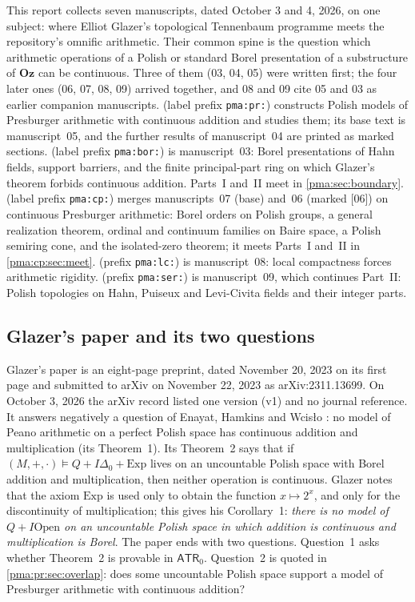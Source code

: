 \documentclass[11pt]{article}
\numberwithin{equation}{section}
\theoremstyle{definition}
\theoremstyle{remark}
\newcommand{\Oz}{\mathbf{Oz}}
\newcommand{\src}[1]{\textup{\textsf{\small[#1]}}}
\begin{document}
This report collects seven manuscripts, dated October 3 and 4, 2026, on one
subject: where Elliot Glazer's topological Tennenbaum programme meets the
repository's omnific arithmetic. Their common spine is the question which
arithmetic operations of a Polish or standard Borel presentation of a
substructure of $\Oz$ can be continuous. Three of them (03, 04, 05) were
written first; the four later ones (06, 07, 08, 09) arrived together, and 08
and 09 cite 05 and 03 as earlier companion manuscripts.
 (label prefix \texttt{pma:pr:}) constructs Polish models of
Presburger arithmetic with continuous addition and studies them; its base
text is manuscript~05, and the further results of manuscript~04 are printed
as marked sections.  (label prefix \texttt{pma:bor:}) is
manuscript~03: Borel presentations of Hahn fields, support barriers, and the
finite principal-part ring on which Glazer's theorem forbids continuous
addition. Parts~I and~II meet in \cref{pma:sec:boundary}.
 (label prefix \texttt{pma:cp:}) merges manuscripts~07 (base)
and~06 (marked \src{06}) on continuous Presburger arithmetic: Borel orders on
Polish groups, a general realization theorem, ordinal and continuum families
on Baire space, a Polish semiring cone, and the isolated-zero theorem; it
meets Parts~I and~II in \cref{pma:cp:sec:meet}.  (prefix
\texttt{pma:lc:}) is manuscript~08: local compactness forces arithmetic
rigidity.  (prefix \texttt{pma:ser:}) is manuscript~09,
which continues Part~II: Polish topologies on Hahn, Puiseux and Levi-Civita
fields and their integer parts.

\subsection{Glazer's paper and its two questions}\label{pma:sec:glazer}

Glazer's paper \cite{Glazer} is an eight-page preprint, dated November 20,
2023 on its first page and submitted to arXiv on November 22, 2023 as
arXiv:2311.13699. On October 3, 2026 the arXiv record listed one version (v1)
and no journal reference. It answers negatively a question of Enayat, Hamkins
and Wcis\l o \cite{EHW}: no model of Peano arithmetic on a perfect Polish
space has continuous addition and multiplication (its Theorem~1). Its
Theorem~2 says that if $(M,+,\cdot)\models Q+I\Delta_0+\mathrm{Exp}$ lives on an
uncountable Polish space with Borel addition and multiplication, then neither
operation is continuous. Glazer notes that the axiom $\mathrm{Exp}$ is used
only to obtain the function $x\mapsto2^x$, and only for the discontinuity of
multiplication; this gives his Corollary~1: \emph{there is no model of
$Q+I\mathrm{Open}$ on an uncountable Polish space in which addition is
continuous and multiplication is Borel}. The paper ends with two questions.
Question~1 asks whether Theorem~2 is provable in $\mathsf{ATR}_0$. Question~2
is quoted in \cref{pma:pr:sec:overlap}: does some uncountable Polish space
support a model of Presburger arithmetic with continuous addition?
\end{document}
